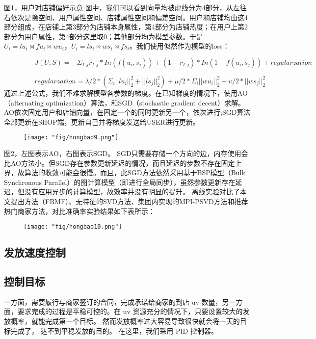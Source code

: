 图1，用户对店铺偏好示意
	图中，我们可以看到向量均被虚线分为4部分，从左往右依次是隐空间、用户属性空间、店铺属性空间和偏差空间。用户和店铺均由这4部分组成，在店铺上第3部分为店铺本身属性，第4部分为店铺热度；在用户上第2部分为用户属性，第4部分这里取0；其他部分均为模型参数。于是$U_{i}=lu_{i}\bowtie fu_{i}\bowtie wu_{i}$，$U_{i}=ls_{i}\bowtie ws_{i}\bowtie fs_{i}$。我们使用似然作为模型的loss：

$\;\;\;\;\;\;\;\;\;\;\;\;\;\;\;\;J(U,S)=-\Sigma_{I,j}r_{I,j}*In(f(u_{i},s_{j}))+(1-r_{I,j})*In(1-f(u_{i},s_{j}))+regularzation\;\;\;\;\;\;\;\;\;\;\;\;\;\;\;\;$ 

$\;\;\;\;\;\;\;\;\;\;\;\;\;\;\;\;regularzation =\lambda/2*(\Sigma_{i}||lu_{i}||_{2}^{2}+||ls_{j}||_{2}^{2})+\mu/2*\Sigma_{i}||wu_{i}||_{2}^{2}+\upsilon/2*||ws_{j}||_{2}^{2}\;\;\;\;\;\;\;\;\;\;\;\;\;\;\;\;\;\;\;\;\;\;\;$ 
	通过上述公式，我们不难求解模型各参数的梯度。在已知梯度的情况下，使用AO（alternating optimization）算法，和SGD（stochastic gradient decent）求解。AO依次固定用户和店铺向量，在固定一个的同时更新另一个，依次进行;SGD算法全部更新在SHOP端，更新自己并将梯度发送给USER进行更新。

\begin{figure}[!h]
	\centering
	\texttt{[image: "fig/hongbao9.png"]}
	\caption{}
	\label{fig:hongbao9}
\end{figure}

图2，左图表示AO，右图表示SGD。
SGD只需要存储一个方向的边，内存使用会比AO方法小。但SGD存在参数更新延迟的情况，而且延迟的步数不存在固定上界，故算法的收敛可能会很慢。而且，此SGD方法依然采用基于BSP模型（Bulk Synchronous Parallel）的图计算模型（即进行全局同步），虽然参数更新存在延迟，但没有应用异步的计算模型，故效率并没有明显的提升。
离线实验对比了本文提出方法（FBMF）、无特征的SVD方法、集团内实现的MPI-PSVD方法和推荐热门商家方法，对比准确率实验结果如下表所示：

\begin{figure}[!h]
	\centering
	\texttt{[image: "fig/hongbao10.png"]}
	\caption{}
	\label{fig:hongbao10}
\end{figure}

\subsection{发放速度控制}
\subsection{控制目标}
一方面，需要履行与商家签订的合同，完成承诺给商家的到店 uv 数量，另一方面，要求完成的过程是平稳可控的。在 uv 资源充分的情况下，只要设置较大的发放概率，就能完成第一个目标。 然而发放概率过大容易导致很快就会将一天的目标完成了， 达不到平稳发放的目的。 在这里，我们采用 PID 控制器。
